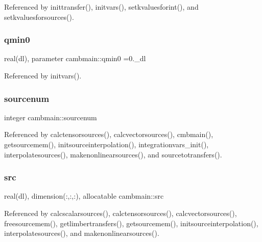 Referenced by inittransfer(), initvars(), setkvaluesforint(), and setkvaluesforsources().

\mbox{\label{namespacecambmain_ac2494adca6c0269bd275ac6125de266c}} 
\subsubsection{\texorpdfstring{qmin0}{qmin0}}
{\footnotesize\ttfamily real(dl), parameter cambmain\+::qmin0 =0.\+\_\+dl\hspace{0.3cm}{\ttfamily [private]}}



Referenced by initvars().

\mbox{\label{namespacecambmain_a7874020426cc2db0dd79451dce8e4476}} 
\subsubsection{\texorpdfstring{sourcenum}{sourcenum}}
{\footnotesize\ttfamily integer cambmain\+::sourcenum\hspace{0.3cm}{\ttfamily [private]}}



Referenced by calctensorsources(), calcvectorsources(), cmbmain(), getsourcemem(), initsourceinterpolation(), integrationvars\+\_\+init(), interpolatesources(), makenonlinearsources(), and sourcetotransfers().

\mbox{\label{namespacecambmain_a799546cf5b0652ca67395d086e02912a}} 
\subsubsection{\texorpdfstring{src}{src}}
{\footnotesize\ttfamily real(dl), dimension(\+:,\+:,\+:), allocatable cambmain\+::src\hspace{0.3cm}{\ttfamily [private]}}



Referenced by calcscalarsources(), calctensorsources(), calcvectorsources(), freesourcemem(), getlimbertransfers(), getsourcemem(), initsourceinterpolation(), interpolatesources(), and makenonlinearsources().

